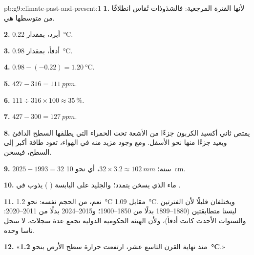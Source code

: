 \begin{solution}{pb:g9:climate-past-and-present:1}
\textbf{1.} لأنها الفترة المرجعية: فالشذوذات تُقاس انطلاقًا من متوسطها
هي.

\textbf{2.} أبرد، بمقدار \qty{0.22}{\degreeCelsius}.

\textbf{3.} أدفأ، بمقدار \qty{0.98}{\degreeCelsius}.

\textbf{4.} $0.98 - (-0.22) = \qty{1.20}{\degreeCelsius}$.

\textbf{5.} $427 - 316 = \qty{111}{ppm}$.

\textbf{6.} $111 \div 316 \times 100 \approx 35~\%$.

\textbf{7.} $427 - 300 = \qty{127}{ppm}$.

\textbf{8.} يمتص ثاني أكسيد الكربون جزءًا من الأشعة تحت الحمراء التي يطلقها
السطح الدافئ ويعيد جزءًا منها نحو الأسفل. ومع وجود مزيد منه في الهواء، تعود
طاقة أكبر إلى السطح، فيسخن.

\textbf{9.} $2025 - 1993 = 32$ سنة؛ $32 \times 3.2 \approx
\qty{102}{mm}$، أي نحو \qty{10}{cm}.

\textbf{10.} ماء  الذي يسخن يتمدد؛ والجليد على اليابسة (
) يذوب في .

\textbf{11.} نعم، من الحجم نفسه: نحو \qty{1.2}{\degreeCelsius} مقابل
\qty{1.09}{\degreeCelsius}. ويختلفان قليلًا لأن الفترتين ليستا متطابقتين
(1880--1899 بدلًا من 1850--1900؛ و2015--2024 بدلًا من 2011--2020: والسنوات
الأحدث كانت أدفأ)، ولأن الهيئة الحكومية الدولية تجمع عدة سجلات، لا سجل ناسا
وحده.

\textbf{12.} «منذ نهاية القرن التاسع عشر، ارتفعت حرارة سطح الأرض بنحو
\textbf{\qty{1.2}{\degreeCelsius}}.»
\end{solution}
